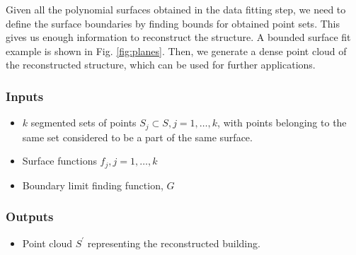 \documentclass[12pt,a4paper]{article}
\begin{document}
    Given all the polynomial surfaces obtained in the data fitting step, we need to define the surface boundaries by finding bounds for obtained point sets. This gives us enough information to reconstruct the structure. A bounded surface fit example is shown in Fig. \ref{fig:planes}. Then, we generate a dense point cloud of the reconstructed structure, which can be used for further applications.   
    
    
    
    \subsubsection{Inputs}
    \begin{itemize}
        \itemsep0em 
        \item $k$ segmented sets of points $S_j \subset S, j=1,\dots,k$, with points belonging to the same set considered to be a part of the same surface.
        \item Surface functions $f_j, j=1,\dots,k$
        \item Boundary limit finding function, $G$
    \end{itemize}
    
    
    \subsubsection{Outputs}
    \begin{itemize}
        \item Point cloud $S^\prime$ representing the reconstructed building.
    \end{itemize}
    
\end{document}
